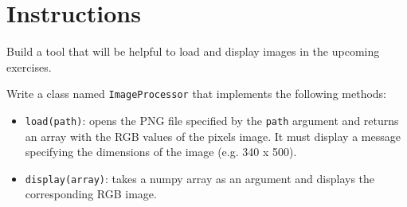 \documentclass{42-en}
\begin{document}
\section*{Instructions}
Build a tool that will be helpful to load and display images in the upcoming exercises.

Write a class named \texttt{ImageProcessor} that implements the following methods:
\begin{itemize}
  \item \texttt{load(path)}: opens the PNG file specified by the \texttt{path} argument and returns an array with the RGB values of the pixels image. It must display a message specifying the dimensions of the image (e.g. 340 x 500).

  \item \texttt{display(array)}: takes a numpy array as an argument and displays the corresponding RGB image.
\end{itemize}


\end{document}
